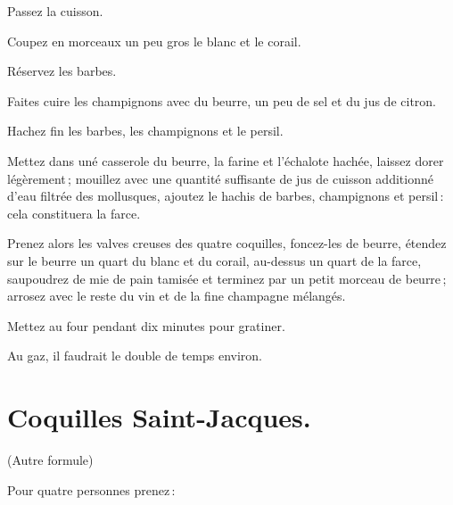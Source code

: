Passez la cuisson.

Coupez en morceaux un peu gros le blanc et le corail.

Réservez les barbes.

Faites cuire les champignons avec du beurre, un peu de sel et du jus de citron.

Hachez fin les barbes, les champignons et le persil.

Mettez dans uné casserole du beurre, la farine et l'échalote hachée, laissez
dorer légèrement ; mouillez avec une quantité suffisante de jus de cuisson
additionné d’eau filtrée des mollusques, ajoutez le hachis de barbes,
champignons et persil : cela constituera la farce.

Prenez alors les valves creuses des quatre coquilles, foncez-les de beurre,
étendez sur le beurre un quart du blanc et du corail, au-dessus un quart de la
farce, saupoudrez de mie de pain tamisée et terminez par un petit morceau de
beurre ; arrosez avec le reste du vin et de la fine champagne mélangés.

Mettez au four pendant dix minutes pour gratiner.

Au gaz, il faudrait le double de temps environ.

\section*{\centering Coquilles Saint-Jacques.}

\begin{center}
\sc\small(Autre formule)
\end{center}

\bigskip

Pour quatre personnes prenez :

